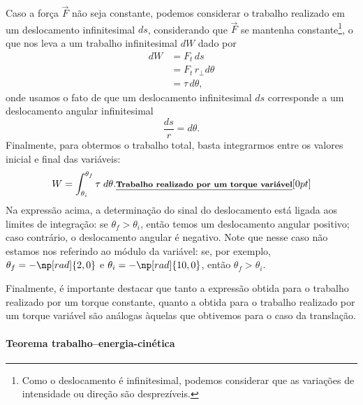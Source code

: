 Caso a força $\vec{F}$ não seja constante, podemos considerar o trabalho realizado em um deslocamento infinitesimal $ds$, considerando que $\vec{F}$ se mantenha constante\footnote{Como o deslocamento é infinitesimal, podemos considerar que as variações de intensidade ou direção são desprezíveis.}, o que nos leva a um trabalho infinitesimal $dW$ dado por
\begin{align}
    dW &= F_t \, ds \\
    &= F_t \, r_\perp d\theta \\
    &= \tau \,d\theta,
\end{align}
%
onde usamos o fato de que um deslocamento infinitesimal $ds$ corresponde a um deslocamento angular infinitesimal
\begin{equation}
    \frac{ds}{r} = d\theta.
\end{equation}
%
Finalmente, para obtermos o trabalho total, basta integrarmos entre os valores inicial e final das variáveis:
\begin{equation}\label{Eq:TrabalhoTorqueVariavel}
    W = \int_{\theta_i}^{\theta_f} \tau \;d\theta. \relax{\footnotesize\emph{\textbf{Trabalho realizado por um torque variável}}}[0pt]
\end{equation}
%
Na expressão acima, a determinação do sinal do deslocamento está ligada aos limites de integração: se $\theta_f > \theta_i$, então temos um deslocamento angular positivo; caso contrário, o deslocamento angular é negativo. Note que nesse caso não estamos nos referindo ao módulo da variável: se, por exemplo, $\theta_f = -\np[rad]{2,0}$ e $\theta_i = -\np[rad]{10,0}$, então $\theta_f > \theta_i$.

Finalmente, é importante destacar que tanto a expressão obtida para o trabalho realizado por um torque constante, quanto a obtida para o trabalho realizado por um torque variável são análogas àquelas que obtivemos para o caso da translação.

\paragraph{Teorema trabalho--energia-cinética}

